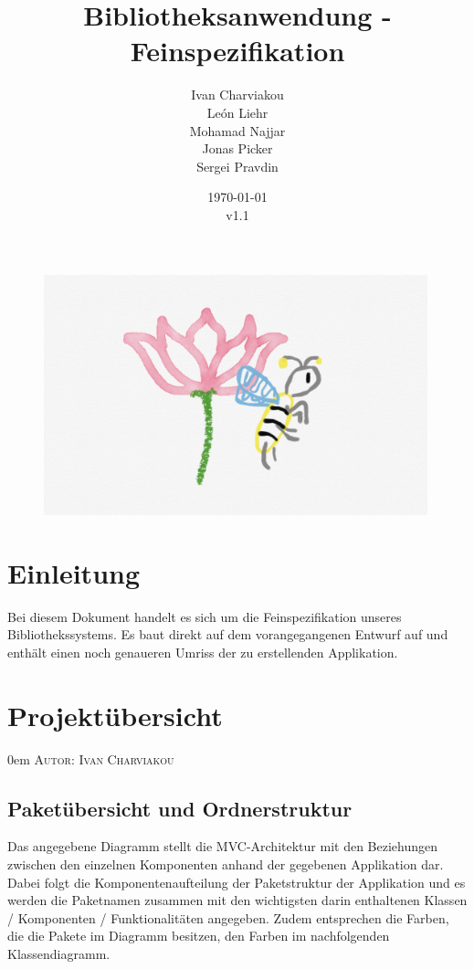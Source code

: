 \documentclass{article}
\title{Bibliotheksanwendung - Feinspezifikation}
\date{\today\\v1.1}
\author{
	Ivan Charviakou\\
	León Liehr\\
	Mohamad Najjar\\
	Jonas Picker\\
	Sergei Pravdin
}
\makeatletter
\newcommand{\sectionauthor}[1]{
	{\parindent 0em \large \scshape Autor: #1 \par \nobreak \vspace*{1em}}
	\@afterheading
}
\makeatother
\begin{document}
\maketitle
\begin{figure}[H]
	\centering
	\includegraphics[width = 30em]{Logo}
\end{figure}
\newpage
\tableofcontents
\newpage


\section{Einleitung}
Bei diesem Dokument handelt es sich um die Feinspezifikation unseres Bibliothekssystems. Es baut direkt auf dem vorangegangenen Entwurf auf und enthält einen noch genaueren Umriss der zu erstellenden Applikation.


\section{Projektübersicht}
\sectionauthor{Ivan Charviakou}

\subsection{Paketübersicht und Ordnerstruktur}
Das angegebene Diagramm stellt die MVC-Architektur mit den Beziehungen zwischen den einzelnen Komponenten anhand der gegebenen Applikation dar.
Dabei folgt die Komponentenaufteilung der Paketstruktur der Applikation und es werden die Paketnamen zusammen mit den wichtigsten darin enthaltenen Klassen / Komponenten / Funktionalitäten angegeben.
Zudem entsprechen die Farben, die die Pakete im Diagramm besitzen, den Farben im nachfolgenden Klassendiagramm. \vspace{0.5em}
\end{document}
